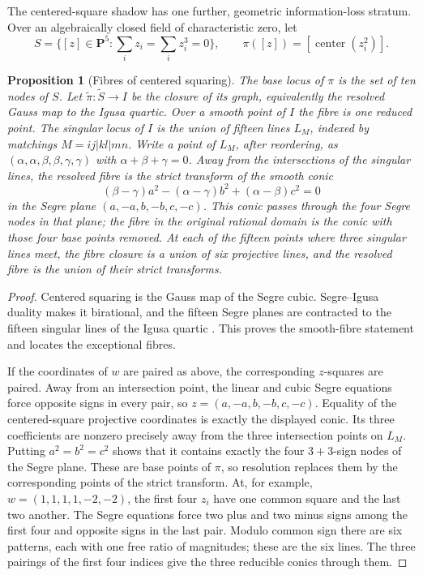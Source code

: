 \documentclass[11pt]{article}
\newtheorem{proposition}[theorem]{Proposition}
\theoremstyle{definition}
\theoremstyle{remark}
\begin{document}
The centered-square shadow has one further, geometric information-loss
stratum.  Over an algebraically closed field of characteristic zero, let
\[
 S=\{[z]\in\mathbf P^5:\textstyle\sum_i z_i=\sum_i z_i^3=0\},
 \qquad
 \pi([z])=[\operatorname{center}(z_i^2)].
\]

\begin{proposition}[Fibres of centered squaring]
\label{prop:polar-fibres}
The base locus of \(\pi\) is the set of ten nodes of \(S\).  Let
\(\widetilde\pi:\widetilde S\to I\) be the closure of its graph, equivalently
the resolved Gauss map to the Igusa quartic.  Over a smooth point of \(I\)
the fibre is one reduced point.  The singular locus of \(I\) is the union
of fifteen lines \(L_M\), indexed by matchings
\(M=ij|kl|mn\).  Write a point of \(L_M\), after reordering, as
\((\alpha,\alpha,\beta,\beta,\gamma,\gamma)\) with
\(\alpha+\beta+\gamma=0\).  Away from the intersections of the singular
lines, the resolved fibre is the strict transform of the smooth conic
\[
 (\beta-\gamma)a^2-(\alpha-\gamma)b^2
      +(\alpha-\beta)c^2=0
\]
in the Segre plane
\((a,-a,b,-b,c,-c)\).  This conic passes through the four Segre nodes in
that plane; the fibre in the original rational domain is the conic with
those four base points removed.  At each of the fifteen points where three
singular lines meet, the fibre closure is a union of six projective lines,
and the resolved fibre is the union of their strict transforms.
\end{proposition}

\begin{proof}
Centered squaring is the Gauss map of the Segre cubic.  Segre--Igusa
duality makes it birational, and the fifteen Segre planes are contracted
to the fifteen singular lines of the Igusa quartic
\cite{KondoSegre}.  This proves the smooth-fibre statement and locates the
exceptional fibres.

If the coordinates of \(w\) are paired as above, the corresponding
\(z\)-squares are paired.  Away from an intersection point, the linear and
cubic Segre equations force opposite signs in every pair, so
\(z=(a,-a,b,-b,c,-c)\).  Equality of the centered-square projective
coordinates is exactly the displayed conic.  Its three coefficients are
nonzero precisely away from the three intersection points on \(L_M\).
Putting \(a^2=b^2=c^2\) shows that it contains exactly the four
\(3+3\)-sign nodes of the Segre plane.  These are base points of \(\pi\),
so resolution replaces them by the corresponding points of the strict
transform.
At, for example, \(w=(1,1,1,1,-2,-2)\), the first four \(z_i\) have one
common square and the last two another.  The Segre equations force two
plus and two minus signs among the first four and opposite signs in the
last pair.  Modulo common sign there are six patterns, each with one free
ratio of magnitudes; these are the six lines.  The three pairings of the
first four indices give the three reducible conics through them.
\end{proof}
\end{document}
